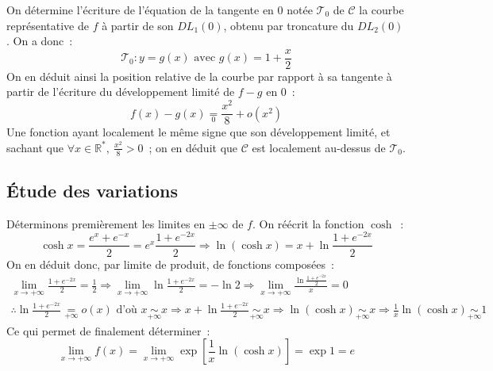 \documentclass{article}
\newcommand{\oo}[1]{+ o\!\left(#1\right)}
\begin{document}
    On détermine l'écriture de l'équation de la tangente en 0 notée $\mathscr{T}_0$ de $\mathscr{C}$ la courbe représentative de $f$ à partir de son $DL_1(0)$, obtenu par troncature du $DL_2(0)$. On a donc~:
    \begin{displaymath}
      \mathscr{T}_0\colon y = g(x) \text{ avec } g(x) = 1 + \frac{x}{2}
    \end{displaymath}
    On en déduit ainsi la position relative de la courbe par rapport à sa tangente à partir de l'écriture du développement limité de $f-g$ en 0~:
    \begin{displaymath}
      f(x) - g(x) \underset{0}{=} \frac{x^2}{8} \oo{x^2}
    \end{displaymath}
    Une fonction ayant localement le même signe que son développement limité, et sachant que $\forall x\in\mathbb{R}^*,\ \frac{x^2}{8} > 0$~; on en déduit que $\mathscr{C}$ est localement au-dessus de $\mathscr{T}_0$.

    \subsection{Étude des variations}

    Déterminons premièrement les limites en $\pm\infty$ de $f$. On réécrit la fonction $\cosh$~:
    \begin{displaymath}
      \cosh x = \frac{e^x + e^{-x}}{2} = e^x \frac{1 + e^{-2x}}{2} \Rightarrow \ln(\cosh x) = x + \ln\frac{1 + e^{-2x}}{2}
    \end{displaymath}
    On en déduit donc, par limite de produit, de fonctions composées~:
    \begin{align*}
      \lim_{x\to +\infty} \frac{1 + e^{-2x}}{2} = \frac{1}{2} \Rightarrow \lim_{x\to +\infty} \ln\frac{1 + e^{-2x}}{2} = -\ln 2 \Rightarrow \lim_{x\to +\infty} \frac{\ln\frac{1 + e^{-2x}}{2}}{x} = 0 \\
      \therefore \ln\frac{1 + e^{-2x}}{2} \underset{+\infty}{=} o(x) \text{ d'où } x \underset{+\infty}{\sim} x
      \Rightarrow x + \ln\frac{1 + e^{-2x}}{2} \underset{+\infty}{\sim} x
      \Rightarrow \ln(\cosh x) \underset{+\infty}{\sim} x
      \Rightarrow \frac{1}{x}\ln(\cosh x) \underset{+\infty}{\sim} 1
    \end{align*}
    Ce qui permet de finalement déterminer~:
    \begin{displaymath}
      \lim_{x\to +\infty} f(x) = \lim_{x\to +\infty} \exp\left[\frac{1}{x}\ln(\cosh x)\right] = \exp 1 = e
    \end{displaymath}
\end{document}
